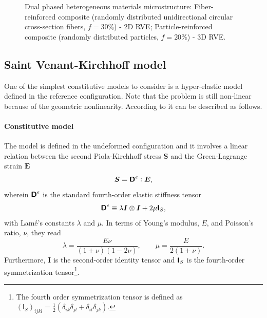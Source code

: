 \begin{figure}[hbt]
\begin{subfigure}[b]{0.45\textwidth}
    \caption{}
    \label{subfig:3d_microstructure}
  \end{subfigure}
\caption{Dual phased heterogeneous materials microstructure:  Fiber-reinforced composite (randomly distributed unidirectional circular cross-section fibers, \(f=30\%\)) - 2D RVE;  Particle-reinforced composite (randomly distributed particles, \(f=20\%\)) - 3D RVE.}
\label{fig:microstructure}
\end{figure}



\subsection{Saint Venant-Kirchhoff model}

One of the simplest constitutive models to consider is a hyper-elastic model defined in the reference configuration.
Note that the problem is still non-linear because of the geometric nonlinearity.
According to \cite{de_geus_finite_2017} it can be described as follows.

\paragraph{Constitutive model}
The model is defined in the undeformed configuration and it involves a linear relation between the second Piola-Kirchhoff stress \(\boldsymbol{S}\) and the Green-Lagrange strain \(\boldsymbol{E}\)
\begin{equation} \label{eq:saint_venant_constitutive_equation}
\boldsymbol{S}=\boldsymbol{\mathsf{D}}^e: \boldsymbol{E},
\end{equation}
wherein \(\boldsymbol{\mathsf{D}}^e\) is the standard fourth-order elastic stiffness tensor
\begin{equation}
\boldsymbol{\mathsf{D}}^e\equiv\lambda \boldsymbol{I} \otimes \boldsymbol{I}+2 \mu \boldsymbol{\mathsf{I}}_{S},
\end{equation}
with Lamé's constants \(\lambda\) and \(\mu .\) In terms of Young's modulus, \(E\), and Poisson's ratio, \(\nu\), they read
\begin{equation}
\lambda=\frac{E \nu}{(1+\nu)(1-2 \nu)}, \qquad \mu=\frac{E}{2(1+\nu)}.
\end{equation}
Furthermore, \(\boldsymbol{I}\) is the second-order identity tensor and \(\boldsymbol{\mathsf{I}}_{S}\) is the fourth-order symmetrization tensor\footnote{The fourth order symmetrization tensor is defined as \({(\mathsf I_S)}_{ijkl} = \frac{1}{2}(\delta_{ik}\delta_{jl} + \delta_{il}\delta_{jk})\).}.

